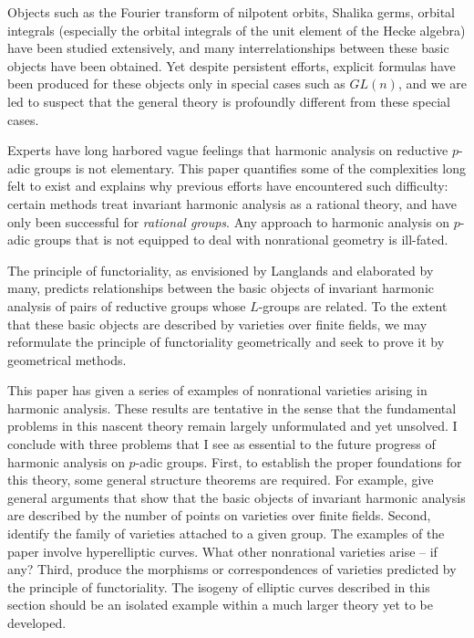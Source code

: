 \bigskip
\line{\hfil \leaders\hrule\hskip1in \hfil}
\bigskip
Objects such as the Fourier transform of nilpotent orbits,
Shalika germs, orbital integrals (especially the orbital integrals
of the unit element of the Hecke algebra) have been studied
extensively, and many interrelationships between these basic objects
have been
obtained.  Yet despite persistent efforts, explicit formulas
have been produced for these objects only in special cases such
as $GL(n)$,
and we are led to suspect that the general theory is
profoundly different from these special cases.

Experts have long harbored vague feelings
that harmonic analysis on reductive $p$-adic groups
is not elementary.  This paper quantifies some of the complexities
long felt to exist and
explains why previous efforts have encountered such difficulty:
certain methods treat invariant harmonic analysis 
as a rational theory, and
have only been successful for {\it rational groups}.
Any approach to harmonic analysis on $p$-adic groups that is
not equipped to deal with nonrational geometry is ill-fated.

The principle of functoriality, as envisioned by Langlands and
elaborated
by many, predicts relationships between the basic objects
of invariant harmonic analysis of pairs of reductive groups
whose $L$-groups
are related.  To the extent that these
basic objects are described by varieties over finite fields,
 we may reformulate the principle of functoriality geometrically
 and seek to prove
it by geometrical methods. 

This paper has
given a series of examples of nonrational varieties arising in
harmonic analysis.
These results are tentative in the sense that the fundamental
problems in this nascent theory 
remain largely unformulated and yet unsolved.  
I conclude with three problems that I see as essential to the
future progress of harmonic analysis on $p$-adic groups.
First, to establish the proper foundations for this theory, some
general structure theorems are required.  For example, give general 
arguments that
show that the basic objects of
invariant harmonic analysis are described by the number of points
on varieties over finite fields.
Second,  identify the family of varieties attached to a given group.
The examples of the paper involve hyperelliptic curves.  What
other nonrational varieties arise -- if any?
Third, produce the morphisms or correspondences of varieties predicted
by the principle of functoriality.  The isogeny of elliptic
curves described in this section should be an isolated example within
a much larger theory yet to be developed.

